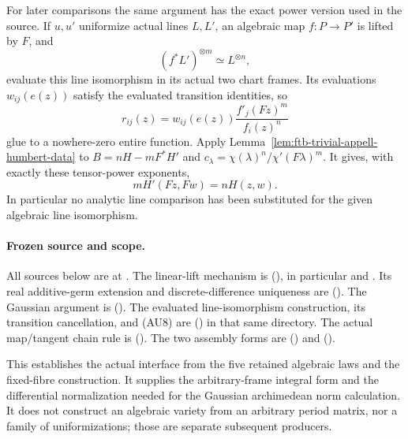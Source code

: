 For later comparisons the same argument has the exact
power version used in the source.
If \(u,u'\) uniformize actual lines \(L,L'\), an algebraic map
\(f:P\to P'\) is lifted by \(F\), and
\[
                         (f^*L')^{\otimes m}\simeq L^{\otimes n},
\]
evaluate this line isomorphism in its actual two chart frames.
Its evaluations \(w_{ij}(e(z))\) satisfy the evaluated
transition identities, so
\[
        r_{ij}(z)=w_{ij}(e(z))
                      \frac{f'_j(Fz)^m}{f_i(z)^n}
\]
glue to a nowhere-zero entire function.
Apply Lemma~\ref{lem:ftb-trivial-appell-humbert-data} to
\(B=nH-mF^*H'\) and
\(c_\lambda=\chi(\lambda)^n/\chi'(F\lambda)^m\).
It gives, with exactly these tensor-power exponents,
\[
                              mH'(Fz,Fw)=nH(z,w).             \tag{AU8}
\]
In particular no analytic line comparison has been substituted
for the given algebraic line isomorphism.

\paragraph{Frozen source and scope.}
All sources below are at .
The linear-lift mechanism is
(),
in particular  and
.
Its real additive-germ extension and discrete-difference uniqueness
are
().
The Gaussian argument is
().
The evaluated line-isomorphism construction, its transition
cancellation, and (AU8) are
()
in that same directory.
The actual map/tangent chain rule is
().
The two assembly forms are
()
and
().

This establishes the actual 
interface from the five retained algebraic laws and the fixed-fibre
construction.  It supplies the arbitrary-frame integral form and
the differential normalization needed for the Gaussian
archimedean norm calculation.
It does not construct an algebraic variety from an arbitrary
period matrix, nor a family of uniformizations; those are separate
subsequent producers.
